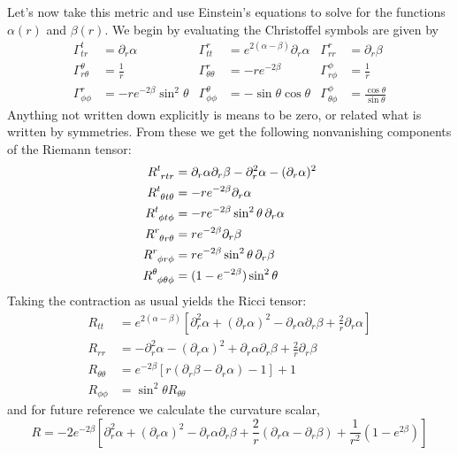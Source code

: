 Let's now take this metric and use Einstein's equations to solve for the functions $\alpha(r)$ and $\beta(r)$. We begin by evaluating the Christoffel symbols are given by
\begin{align*}
    \Gamma_{tr}^t&=\partial_r\alpha & \Gamma_{tt}^r&=e^{2(\alpha-\beta)}\partial_r\alpha & \Gamma_{rr}^r&=\partial_r \beta\\
    \Gamma_{r\theta}^\theta&=\frac{1}{r} & \Gamma_{\theta \theta}^r&=-re^{-2\beta} & \Gamma_{r\phi}^\phi &=\frac{1}{r}\\
    \Gamma_{\phi\phi}^r&=-re^{-2\beta}\sin^2\theta & \Gamma_{\phi\phi}^\theta &=-\sin\theta\cos\theta & \Gamma_{\theta\phi}^\phi &=\frac{\cos\theta}{\sin\theta}
\end{align*}
Anything not written down explicitly is means to be zero, or related what is written by symmetries. From these we get the following nonvanishing components of the Riemann tensor:
\begin{align*}
    \tensor{R}{^t_{rtr}}&=\partial_r\alpha\partial_r\beta-\partial^2_r\alpha-(\partial_r\alpha)^2\\
    \tensor{R}{^t_{\theta t \theta}}&=-re^{-2\beta}\partial_r\alpha\\
    \tensor{R}{^t_{\phi t \phi}}&=-re^{-2\beta}\sin^2\theta\,\partial_r\alpha\\
    \tensor{R}{^r_{\theta r \theta}}&=re^{-2\beta}\partial_r\beta\\
    \tensor{R}{^r_{\phi r \phi}}&=re^{-2\beta}\sin^2\theta\,\partial_r\beta\\
    \tensor{R}{^\theta_{\phi\theta\phi}}&=(1-e^{-2\beta})\sin^2\theta
\end{align*}
Taking the contraction as usual yields the Ricci tensor:
\begin{align*}
    R_{tt}&=e^{2(\alpha-\beta)}\left[\partial^2_r\alpha+(\partial_r\alpha)^2-\partial_r\alpha\partial_r\beta+\frac{2}{r}\partial_r\alpha\right]\\
    R_{rr}&=-\partial^2_r\alpha-(\partial_r\alpha)^2+\partial_r\alpha\partial_r\beta+\frac{2}{r}\partial_r\beta\\
    R_{\theta\theta}&=e^{-2\beta}[r(\partial_r\beta-\partial_r\alpha)-1]+1\\
    R_{\phi\phi}&=\sin^2\theta R_{\theta\theta}
\end{align*}
and for future reference we calculate the curvature scalar,
\begin{equation*}
    R=-2e^{-2\beta}\left[\partial^2_r\alpha+(\partial_r\alpha)^2-\partial_r\alpha\partial_r\beta+\frac{2}{r}(\partial_r\alpha-\partial_r\beta)+\frac{1}{r^2}(1-e^{2\beta})\right]
\end{equation*}

